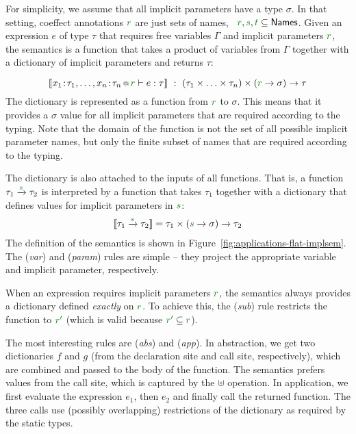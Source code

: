 For simplicity, we assume that all implicit parameters have a type $\sigma$. In that setting, 
coeffect annotations $\cclrd{r}$ are just sets of names, \ie~$\cclrd{r}, \cclrd{s}, \cclrd{t} \subseteq \ident{Names}$.
Given an expression $e$ of type $\tau$ that requires free variables $\Gamma$ and implicit parameters 
$\cclrd{r}$, the semantics is a function that takes a product of variables from $\Gamma$ together 
with a dictionary of implicit parameters and returns $\tau$:

\begin{equation*}
\sem{\coctx{x_1\!:\!\tau_1, \ldots, x_n\!:\!\tau_n}{ \cclrd{r} } \vdash e : \tau} 
  ~:~ (\tau_1 \times \ldots \times \tau_n) \times (\cclrd{r} \rightarrow \sigma) \rightarrow \tau
\end{equation*}
%
The dictionary is represented as a function from $\cclrd{r}$ to $\sigma$. This means that it 
provides a $\sigma$ value for all implicit parameters that are required according to the typing.
Note that the domain of the function is not the set of all possible implicit parameter names, but
only the finite subset of names that are required according to the typing.

The dictionary is also attached to the inputs of all functions. That is, a function $\tau_1 \xrightarrow{\cclrd{s}} \tau_2$
is interpreted by a function that takes $\tau_1$ together with a dictionary that defines values for
implicit parameters in $\cclrd{s}$:
%
\begin{equation*}
\begin{array}{l}
 \sem{\tau_1 \xrightarrow{\cclrd{s}} \tau_2} = \tau_1 \times (\cclrd{s} \rightarrow \sigma) \rightarrow \tau_2
\end{array}
\end{equation*}
%
The definition of the semantics is shown in Figure~\ref{fig:applications-flat-implsem}. The 
(\emph{var}) and (\emph{param}) rules are simple -- they project the appropriate variable and 
implicit parameter, respectively.

When an expression requires implicit parameters $\cclrd{r}$, the semantics always provides a 
dictionary defined \emph{exactly} on $\cclrd{r}$. To achieve this, the (\emph{sub}) rule restricts
the function to $\cclrd{r'}$ (which is valid because $\cclrd{r'} \subseteq \cclrd{r}$).

The most interesting rules are (\emph{abs}) and (\emph{app}). In abstraction, we get two dictionaries
$f$ and $g$ (from the declaration site and call site, respectively), which are combined and passed 
to the body of the function. The semantics prefers values from the call site, which is captured by
the $\uplus$ operation. In application, we first evaluate the expression $e_1$, then $e_2$ and finally
call the returned function. The three calls use (possibly overlapping) restrictions of the dictionary
as required by the static types.

